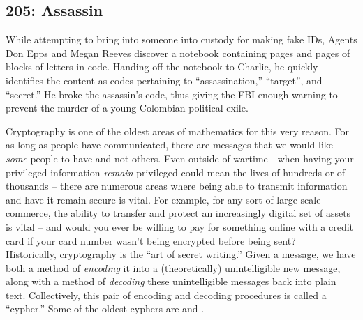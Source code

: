 \newpage
\subsection{205: Assassin\label{205}}

While attempting to bring into someone into custody for making fake IDs, Agents Don Epps and Megan Reeves discover a notebook containing pages and pages of blocks of letters in code. Handing off the notebook to Charlie, he quickly identifies the content as codes pertaining to ``assassination,'' ``target'', and ``secret.'' He broke the assassin's code, thus giving the FBI enough warning to prevent the murder of a young Colombian political exile. \\


Cryptography is one of the oldest areas of mathematics for this very reason. For as long as people have communicated, there are messages that we would like \emph{some} people to have and not others. Even outside of wartime - when having your privileged information \emph{remain} privileged could mean the lives of hundreds or of thousands -- there are numerous areas where being able to transmit information and have it remain secure is vital. For example, for any sort of large scale commerce, the ability to transfer and protect an increasingly digital set of assets is vital -- and would you ever be willing to pay for something online with a credit card if your card number wasn't being encrypted before being sent? \\

Historically, cryptography is the ``art of secret writing.'' Given a message, we have both a method of \emph{encoding} it into a (theoretically) unintelligible new message, along with a method of \emph{decoding} these unintelligible messages back into plain text. Collectively, this pair of encoding and decoding procedures is called a ``cypher.'' Some of the oldest cyphers are  and . \\

